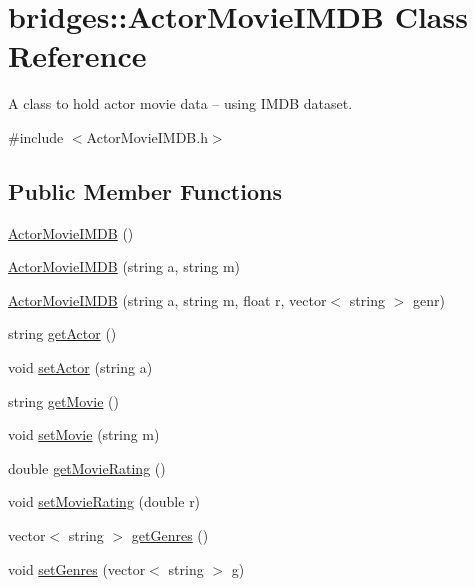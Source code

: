 \hypertarget{classbridges_1_1_actor_movie_i_m_d_b}{}\section{bridges\+:\+:Actor\+Movie\+I\+M\+DB Class Reference}
\label{classbridges_1_1_actor_movie_i_m_d_b}


A class to hold actor movie data -- using I\+M\+DB dataset.  




{\ttfamily \#include $<$Actor\+Movie\+I\+M\+D\+B.\+h$>$}

\subsection*{Public Member Functions}
\begin{DoxyCompactItemize}
\item 
\mbox{\hyperlink{classbridges_1_1_actor_movie_i_m_d_b_acd1db3914821a79a7d8fb506151d36a4}{Actor\+Movie\+I\+M\+DB}} ()
\item 
\mbox{\hyperlink{classbridges_1_1_actor_movie_i_m_d_b_a4dff1ed0200a4c1013bd33d566e57640}{Actor\+Movie\+I\+M\+DB}} (string a, string m)
\item 
\mbox{\hyperlink{classbridges_1_1_actor_movie_i_m_d_b_a8d9cba2169fb26d97754a524c348cf86}{Actor\+Movie\+I\+M\+DB}} (string a, string m, float r, vector$<$ string $>$ genr)
\item 
string \mbox{\hyperlink{classbridges_1_1_actor_movie_i_m_d_b_a35e46f1c3cfb30f196710c5b9c437b86}{get\+Actor}} ()
\item 
void \mbox{\hyperlink{classbridges_1_1_actor_movie_i_m_d_b_a97447a734487e56ab9c785d056363e68}{set\+Actor}} (string a)
\item 
string \mbox{\hyperlink{classbridges_1_1_actor_movie_i_m_d_b_ae35c9a5c7ba79538f050e8009ddba786}{get\+Movie}} ()
\item 
void \mbox{\hyperlink{classbridges_1_1_actor_movie_i_m_d_b_a08b64b8728a59a08bb565c8556b01509}{set\+Movie}} (string m)
\item 
double \mbox{\hyperlink{classbridges_1_1_actor_movie_i_m_d_b_abf558f49397e41f2a5edf0e6011c97e4}{get\+Movie\+Rating}} ()
\item 
void \mbox{\hyperlink{classbridges_1_1_actor_movie_i_m_d_b_aea16db5315526ff31a1685c08390cdc7}{set\+Movie\+Rating}} (double r)
\item 
vector$<$ string $>$ \mbox{\hyperlink{classbridges_1_1_actor_movie_i_m_d_b_a5d768342eb18fbf65cd6c20b73b93b6c}{get\+Genres}} ()
\item 
void \mbox{\hyperlink{classbridges_1_1_actor_movie_i_m_d_b_a04858487370565e12e112a6355654ce5}{set\+Genres}} (vector$<$ string $>$ g)
\end{DoxyCompactItemize}



